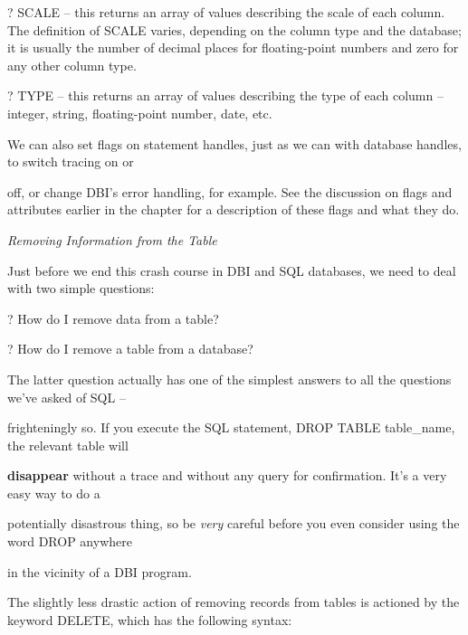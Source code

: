 \documentclass[a4paper,11pt]{book}
\begin{document}
\noindent ? SCALE -- this returns an array of values describing the scale of each column. The definition of SCALE varies, depending on the column type and the database; it is usually the number of decimal places for floating-point numbers and zero for any other column type.

\noindent 

\noindent ? TYPE -- this returns an array of values describing the type of each column -- integer, string, floating-point number, date, etc.

\noindent 

\noindent 

\noindent We can also set flags on statement handles, just as we can with database handles, to switch tracing on or

\noindent off, or change DBI's error handling, for example. See the discussion on flags and attributes earlier in the chapter for a description of these flags and what they do.

\noindent 

\noindent \textit{Removing Information from the Table}

\noindent Just before we end this crash course in DBI and SQL databases, we need to deal with two simple questions:

\noindent 

\noindent ? How do I remove data from a table?

\noindent 

\noindent ? How do I remove a table from a database?

\noindent 

\noindent 

\noindent The latter question actually has one of the simplest answers to all the questions we've asked of SQL --

\noindent frighteningly so. If you execute the SQL statement, DROP TABLE table\_name, the relevant table will

\noindent \textbf{disappear }without a trace and without any query for confirmation. It's a very easy way to do a

\noindent potentially disastrous thing, so be \textit{very }careful before you even consider using the word DROP anywhere

\noindent in the vicinity of a DBI program.

\noindent 

\noindent The slightly less drastic action of removing records from tables is actioned by the keyword DELETE, which has the following syntax:
\end{document}
